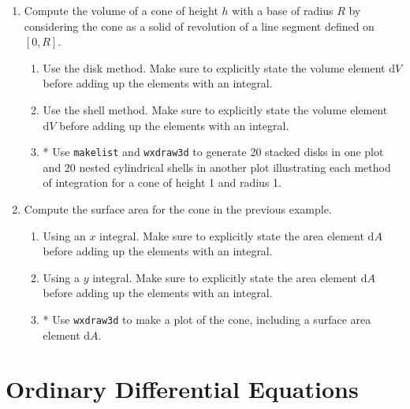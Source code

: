 \documentclass[10.5pt,twoside]{report}
\theoremstyle{definition}
\begin{document}
\begin{enumerate}
\item Compute the volume of a cone of height $h$ with a base of radius $R$ by considering the cone as a solid of revolution of a line segment defined on $[0,R]$.  
\begin{enumerate}
  \item Use the disk method.  Make sure to explicitly state the volume element $\mathrm{d}V$ before adding up the elements with an integral.
  \item Use the shell method.  Make sure to explicitly state the volume element $\mathrm{d}V$ before adding up the elements with an integral.
  \item * Use \verb|makelist| and \verb|wxdraw3d| to generate 20 stacked disks in one plot and 20 nested cylindrical shells in another plot illustrating each method of integration for a cone of height 1 and radius 1.
\end{enumerate}
  
\item Compute the surface area for the cone in the previous example.
\begin{enumerate}
  \item Using an $x$ integral.  Make sure to explicitly state the area element $\mathrm{d}A$ before adding up the elements with an integral.
  \item Using a $y$ integral.  Make sure to explicitly state the area element $\mathrm{d}A$ before adding up the elements with an integral.
  \item * Use \verb|wxdraw3d| to make a plot of the cone, including a surface area element $\mathrm{d}A$.

\end{enumerate}




\end{enumerate}

\pagebreak



\chapter{Ordinary Differential Equations}

\vspace*{\fill}

\minitoc

\vspace*{\fill}


\newline
\newline
\end{document}
